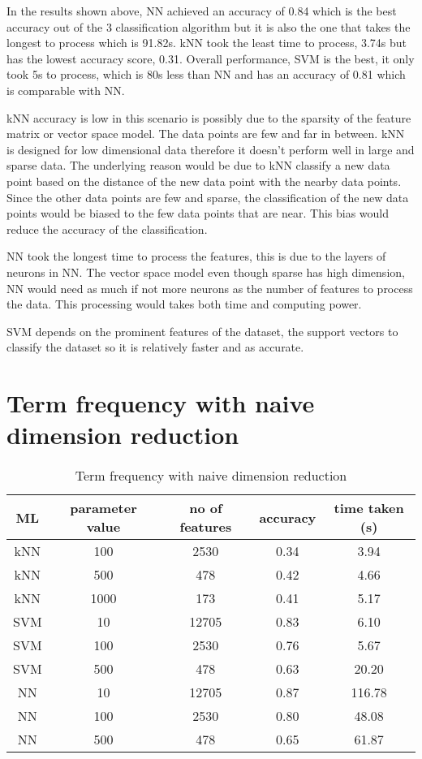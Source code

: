 In the results shown above, NN achieved an accuracy of 0.84 which is the best accuracy out of the 3 classification algorithm but it is also the one that takes the longest to process which is 91.82s. kNN took the least time to process, 3.74s but has the lowest accuracy score, 0.31. Overall performance, SVM is the best, it only took 5s to process, which is 80s less than NN and has an accuracy of 0.81 which is comparable with NN. 

kNN accuracy is low in this scenario is possibly due to the sparsity of the feature matrix or vector space model. The data points are few and far in between. kNN is designed for low dimensional data therefore it doesn't perform well in large and sparse data. The underlying reason would be due to kNN classify a new data point based on the distance of the new data point with the nearby data points. Since the other data points are few and sparse, the classification of the new data points would be biased to the few data points that are near. This bias would reduce the accuracy of the classification. \cite{knnDrawback}

NN took the longest time to process the features, this is due to the layers of neurons in NN. The vector space model even though sparse has high dimension, NN would need as much if not more neurons as the number of features to process the data. This processing would takes both time and computing power.

SVM depends on the prominent features of the dataset, the support vectors to classify the dataset so it is relatively faster and as accurate.

\clearpage
\section{Term frequency with naive dimension reduction}

\begin{table} [ht]
	\centering
	\begin{tabular}{|| c | c | c | c | c||}
		\hline
		ML & parameter value & no of features & accuracy & time taken (s) \\ [0.5ex]
		\hline\hline
		kNN & 100 & 2530 & 0.34 & 3.94 \\ 
		\hline
		kNN & 500 & 478 & 0.42 & 4.66 \\ 
		\hline
		kNN & 1000 & 173 & 0.41 & 5.17 \\ 
		\hline\hline
		SVM & 10 & 12705 & 0.83 & 6.10 \\
		\hline
		SVM & 100 & 2530 & 0.76 & 5.67 \\
		\hline
		SVM & 500 & 478 & 0.63 & 20.20 \\
		\hline\hline
		NN & 10 & 12705 & 0.87 & 116.78 \\
		\hline
		NN & 100 & 2530 & 0.80 & 48.08 \\
		\hline
		NN & 500 & 478 & 0.65 & 61.87 \\
		\hline
	\end{tabular}
\caption{Term frequency with naive dimension reduction}
\label{tbl:termFrequencyNaive}
\end{table}

